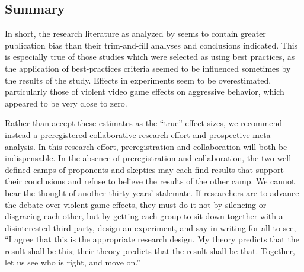 \documentclass[man]{apa6}
\begin{document}
\subsection{Summary}
In short, the research literature as analyzed by \citet{Anderson:etal:2010} seems to contain greater publication bias than their trim-and-fill analyses and conclusions indicated. This is especially true of those studies which were selected as using best practices, as the application of best-practices criteria seemed to be influenced sometimes by the results of the study. Effects in experiments seem to be overestimated, particularly those of violent video game effects on aggressive behavior, which appeared to be very close to zero. 

Rather than accept these estimates as the ``true'' effect sizes, we recommend instead a preregistered collaborative research effort and prospective meta-analysis. In this research effort, preregistration and collaboration will both be indispensable. In the absence of preregistration and collaboration, the two well-defined camps of proponents and skeptics may each find results that support their conclusions and refuse to believe the results of the other camp. We cannot bear the thought of another thirty years' stalemate. If researchers are to advance the debate over violent game effects, they must do it not by silencing or disgracing each other, but by getting each group to sit down together with a disinterested third party, design an experiment, and say in writing for all to see, ``I agree that this is the appropriate research design. My theory predicts that the result shall be this; their theory predicts that the result shall be that. Together, let us see who is right, and move on.''

\end{document}
